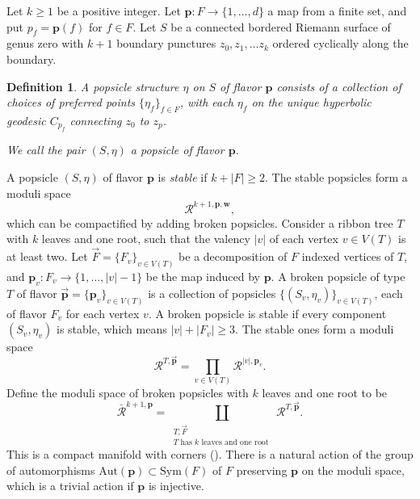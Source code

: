 \documentclass[11pt]{amsproc}
\def\cR{\mathcal{R}}
\def\r#1{\mathrm{#1}}
\newtheorem{defn}[lem]{Definition}
\theoremstyle{remark}
\numberwithin{equation}{section}
\begin{document}
Let $k \ge 1$ be a positive integer.
Let $\mathbf{p}: F \to \{1, \ldots, d\}$ a map from a finite set,
and put $p_{f} = \mathbf{p}(f)$ for $f \in F$.
Let $S$ be a connected bordered Riemann surface of genus zero with $k+1$ boundary punctures $z_{0}, z_{1}, \ldots z_{k}$ ordered cyclically along the boundary.

\begin{defn}\label{def: popsicles}
A popsicle structure $\eta$ on $S$ of flavor $\mathbf{p}$ consists of a collection of choices of preferred points $\{\eta_{f}\}_{f \in F}$,
with each $\eta_{f}$ on the unique hyperbolic geodesic $C_{p_{f}}$ connecting $z_{0}$ to $z_{p}$.

We call the pair $(S, \eta)$ a popsicle of flavor $\mathbf{p}$.
\end{defn}

A popsicle $(S, \eta)$ of flavor $\mathbf{p}$ is {\it stable} if $k+|F| \ge 2$.
The stable popsicles form a moduli space 
\begin{equation}
\cR^{k+1, \mathbf{p}, \mathbf{w}},
\end{equation}
which can be compactified by adding broken popsicles.
Consider a ribbon tree $T$ with $k$ leaves and one root,
such that the valency $|v|$ of each vertex $v \in V(T)$ is at least two.
Let $\vec{F} = \{F_{v}\}_{v \in V(T)}$ be a decomposition of $F$ indexed vertices of $T$,
and $\mathbf{p}_{v}: F_{v} \to \{1, \ldots, |v|-1\}$ be the map induced by $\mathbf{p}$.
A broken popsicle of type $T$ of flavor $\vec{\mathbf{p}} = \{\mathbf{p}_{v}\}_{v \in V(T)}$ is a collection of popsicles $\{(S_{v}, \eta_{v})\}_{v \in V(T)}$,
each of flavor $F_{v}$ for each vertex $v$.
A broken popsicle is stable if every component $(S_{v}, \eta_{v})$ is stable, which means $|v|+|F_{v}| \ge 3$.
The stable ones form a moduli space
\begin{equation}
\cR^{T, \vec{\mathbf{p}}} = \prod_{v \in V(T)} \cR^{|v|, \mathbf{p}_{v}}.
\end{equation}
Define the moduli space of broken popsicles with $k$ leaves and one root to be
\begin{equation}
\bar{\cR}^{k+1, \mathbf{p}} = \coprod_{\substack{T, \vec{F}\\ T \text{ has } k \text{ leaves and one root }}} \cR^{T, \vec{\mathbf{p}}}.
\end{equation}
This is a compact manifold with corners (\cite{abouzaid-seidel}).
There is a natural action of the group of automorphisms $\r{Aut}(\mathbf{p}) \subset \r{Sym}(F)$ of $F$ preserving $\mathbf{p}$ on the moduli space,
which is a trivial action if $\mathbf{p}$ is injective.
\end{document}
